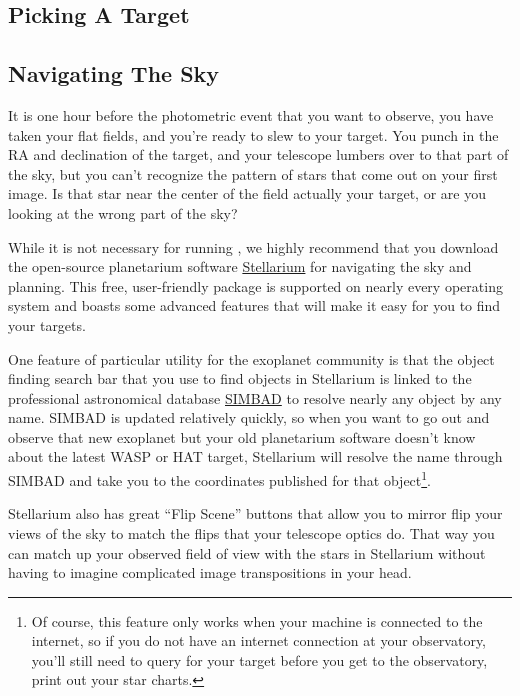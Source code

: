 \documentclass[a4paper]{article}
\begin{document}
\subsection{Picking A Target}



\subsection{Navigating The Sky} \label{sec:nav}

It is one hour before the photometric event that you want to observe, you have taken your flat fields, and you're ready to slew to your target. You punch in the RA and declination of the target, and your telescope lumbers over to that part of the sky, but you can't recognize the pattern of stars that come out on your first image. Is that star near the center of the field actually your target, or are you looking at the wrong part of the sky? 

While it is not necessary for running \oscaar, we highly recommend that you download the open-source planetarium software \href{http://www.stellarium.org/}{Stellarium} for navigating the sky and planning. This free, user-friendly package is supported on nearly every operating system and boasts some advanced features that will make it easy for you to find your targets. 

One feature of particular utility for the exoplanet community is that the object finding search bar that you use to find objects in Stellarium is linked to the professional astronomical database \href{http://simbad.harvard.edu/simbad/}{SIMBAD} to resolve nearly any object by any name. SIMBAD is updated relatively quickly, so when you want to go out and observe that new exoplanet but your old planetarium software doesn't know about the latest WASP or HAT target, Stellarium will resolve the name through SIMBAD and take you to the coordinates published for that object\footnote{Of course, this feature only works when your machine is connected to the internet, so if you do not have an internet connection at your observatory, you'll still need to query for your target before you get to the observatory, print out your star charts.}.

Stellarium also has great ``Flip Scene'' buttons that allow you to mirror flip your views of the sky to match the flips that your telescope optics do. That way you can match up your observed field of view with the stars in Stellarium without having to imagine complicated image transpositions in your head.
\end{document}
